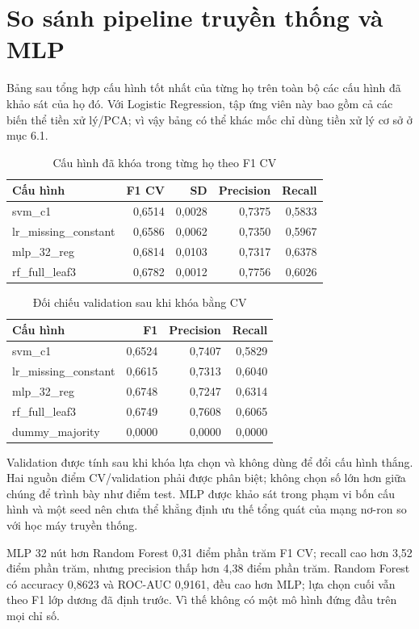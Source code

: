 \section{So sánh pipeline truyền thống và MLP}
\label{sec:6_4}
Bảng sau tổng hợp cấu hình tốt nhất của từng họ trên toàn bộ các cấu hình đã khảo sát của họ đó. Với Logistic Regression, tập ứng viên này bao gồm cả các biến thể tiền xử lý/PCA; vì vậy bảng có thể khác mốc chỉ dùng tiền xử lý cơ sở ở mục 6.1.
\begin{table}[htbp]
\centering\scriptsize
\caption{Cấu hình đã khóa trong từng họ theo F1 CV}\label{tab:cv-family-winners}
\begin{tabular}{lrrrr}
\toprule
Cấu hình & F1 CV & SD & Precision & Recall \\
\midrule
svm\_c1 & 0,6514 & 0,0028 & 0,7375 & 0,5833 \\
lr\_missing\_constant & 0,6586 & 0,0062 & 0,7350 & 0,5967 \\
mlp\_32\_reg & 0,6814 & 0,0103 & 0,7317 & 0,6378 \\
rf\_full\_leaf3 & 0,6782 & 0,0012 & 0,7756 & 0,6026 \\
\bottomrule
\end{tabular}
\end{table}
\begin{table}[htbp]
\centering\small
\caption{Đối chiếu validation sau khi khóa bằng CV}\label{tab:validation-locked}
\begin{tabular}{lrrr}
\toprule
Cấu hình & F1 & Precision & Recall \\
\midrule
svm\_c1 & 0,6524 & 0,7407 & 0,5829 \\
lr\_missing\_constant & 0,6615 & 0,7313 & 0,6040 \\
mlp\_32\_reg & 0,6748 & 0,7247 & 0,6314 \\
rf\_full\_leaf3 & 0,6749 & 0,7608 & 0,6065 \\
dummy\_majority & 0,0000 & 0,0000 & 0,0000 \\
\bottomrule
\end{tabular}
\end{table}
Validation được tính sau khi khóa lựa chọn và không dùng để đổi cấu hình thắng. Hai nguồn điểm CV/validation phải được phân biệt; không chọn số lớn hơn giữa chúng để trình bày như điểm test. MLP được khảo sát trong phạm vi bốn cấu hình và một seed nên chưa thể khẳng định ưu thế tổng quát của mạng nơ-ron so với học máy truyền thống.

MLP 32 nút hơn Random Forest 0,31 điểm phần trăm F1 CV; recall cao hơn 3,52 điểm phần trăm, nhưng precision thấp hơn 4,38 điểm phần trăm. Random Forest có accuracy 0,8623 và ROC-AUC 0,9161, đều cao hơn MLP; lựa chọn cuối vẫn theo F1 lớp dương đã định trước. Vì thế không có một mô hình đứng đầu trên mọi chỉ số.

